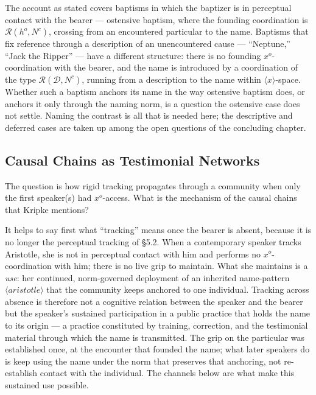 \documentclass[12pt,a4paper]{article}
\begin{document}
The account as stated covers baptisms in which the baptizer is in perceptual contact with the bearer --- ostensive baptism, where the founding coordination is \(\mathcal{R}(h^o, N^c)\), crossing from an encountered particular to the name. Baptisms that fix reference through a description of an unencountered cause --- ``Neptune,'' ``Jack the Ripper'' --- have a different structure: there is no founding \(x^o\)-coordination with the bearer, and the name is introduced by a coordination of the type \(\mathcal{R}(\mathcal{D}, N^c)\), running from a description to the name within \(\langle x \rangle\)-space. Whether such a baptism anchors its name in the way ostensive baptism does, or anchors it only through the naming norm, is a question the ostensive case does not settle. Naming the contrast is all that is needed here; the descriptive and deferred cases are taken up among the open questions of the concluding chapter.

\subsection{Causal Chains as Testimonial Networks}\label{causal-chains-as-testimonial-networks}

The question is how rigid tracking propagates through a community when only the first speaker(s) had \(x^o\)-access. What is the mechanism of the causal chains that Kripke mentions?

It helps to say first what ``tracking'' means once the bearer is absent, because it is no longer the perceptual tracking of §5.2. When a contemporary speaker tracks Aristotle, she is not in perceptual contact with him and performs no \(x^o\)-coordination with him; there is no live grip to maintain. What she maintains is a \emph{use}: her continued, norm-governed deployment of an inherited name-pattern \(\langle aristotle \rangle\) that the community keeps anchored to one individual. Tracking across absence is therefore not a cognitive relation between the speaker and the bearer but the speaker's sustained participation in a public practice that holds the name to its origin --- a practice constituted by training, correction, and the testimonial material through which the name is transmitted. The grip on the particular was established once, at the encounter that founded the name; what later speakers do is keep using the name under the norm that preserves that anchoring, not re-establish contact with the individual. The channels below are what make this sustained use possible.
\end{document}
